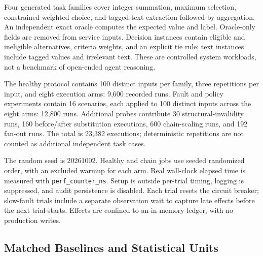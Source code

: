 \documentclass[10pt,twocolumn,a4paper]{article}
\begin{document}
Four generated task families cover integer summation, maximum selection, constrained weighted choice, and tagged-text extraction followed by aggregation. An independent exact oracle computes the expected value and label. Oracle-only fields are removed from service inputs. Decision instances contain eligible and ineligible alternatives, criteria weights, and an explicit tie rule; text instances include tagged values and irrelevant text. These are controlled system workloads, not a benchmark of open-ended agent reasoning.


The healthy protocol contains 100 distinct inputs per family, three repetitions per input, and eight execution arms: 9,600 recorded runs. Fault and policy experiments contain 16 scenarios, each applied to 100 distinct inputs across the eight arms: 12,800 runs. Additional probes contribute 30 structural-invalidity runs, 160 before/after substitution executions, 600 chain-scaling runs, and 192 fan-out runs. The total is 23,382 executions; deterministic repetitions are not counted as additional independent task cases.


The random seed is 20261002. Healthy and chain jobs use seeded randomized order, with an excluded warmup for each arm. Real wall-clock elapsed time is measured with {\small{}\nolinkurl{perf_counter_ns}}. Setup is outside per-trial timing, logging is suppressed, and audit persistence is disabled. Each trial resets the circuit breaker; slow-fault trials include a separate observation wait to capture late effects before the next trial starts. Effects are confined to an in-memory ledger, with no production writes.


\subsection{Matched Baselines and Statistical Units}
\end{document}
